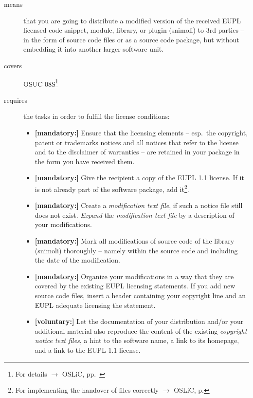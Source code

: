 \begin{description}
\item[means] that you are going to distribute a modified version of the received
EUPL licensed code snippet, module, library, or plugin (snimoli) to 3rd parties
-- in the form of source code files or as a source code package, but without
embedding it into another larger software unit.
\item[covers] OSUC-08S\footnote{For details $\rightarrow$ OSLiC, pp.\
\pageref{OSUC-08S-DEF}}
\item[requires] the tasks in order to fulfill the license conditions:
\begin{itemize}
  
  \item \textbf{[mandatory:]} Ensure that the licensing elements -- esp.\ the
  copyright, patent or trademarks notices and all notices that refer to the
  license and to the disclaimer of warranties -- are retained in your package in
  the form you have received them.
  
  \item \textbf{[mandatory:]} Give the recipient a copy of the EUPL 1.1
  license. If it is not already part of the software package, add
  it\footnote{For implementing the handover of files correctly $\rightarrow$
  OSLiC, p. \pageref{DistributingFilesHint}}.

  \item \textbf{[mandatory:]} Create a \emph{modification text file}, if such a
  notice file still does not exist. \emph{Expand} the \emph{modification text
  file} by a description of your modifications.
  
  \item \textbf{[mandatory:]} Mark all modifications of source code of the
  library (snimoli) thoroughly -- namely within the source code and including
  the date of the modification.
   
  \item \textbf{[mandatory:]} Organize your modifications in a way that they are
  covered by the existing EUPL licensing statements. If you add new source code
  files, insert a header containing your copyright line and an EUPL adequate
  licensing the statement.
  
  \item \textbf{[voluntary:]} Let the documentation of your distribution and/or
  your additional material  also reproduce the content of the existing
  \emph{copyright notice text files}, a hint to the software name, a link to its
  homepage, and a link to the EUPL 1.1 license.


\end{itemize}
\end{description}
